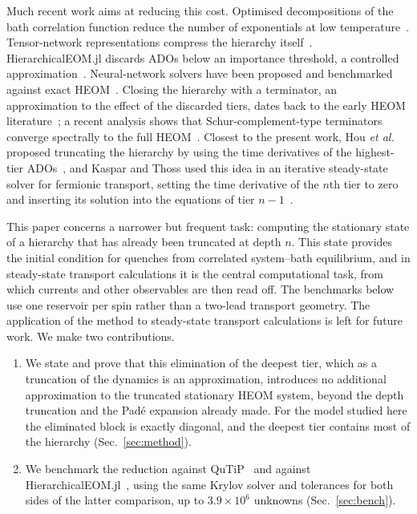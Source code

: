 \documentclass[11pt,a4paper]{article}
\begin{document}
Much recent work aims at reducing this cost. Optimised decompositions of the
bath correlation function reduce the number of exponentials at low
temperature~\cite{HuXuYan2010,Xu2022,Dan2023}. Tensor-network representations
compress the hierarchy itself~\cite{Shi2018,Borrelli2019,Ke2022}.
HierarchicalEOM.jl discards ADOs below an importance threshold, a controlled
approximation~\cite{Huang2023}. Neural-network solvers have been proposed and
benchmarked against exact HEOM~\cite{Cao2025,Cao2026}. Closing the hierarchy
with a terminator, an approximation to the effect of the discarded tiers, dates
back to the early HEOM literature~\cite{TanimuraWolynes1991,IshizakiTanimura2005};
a recent analysis shows that Schur-complement-type terminators converge
spectrally to the full HEOM~\cite{Vadimov2026}. Closest to the present work,
Hou \emph{et al.} proposed truncating the hierarchy by using the time
derivatives of the highest-tier ADOs~\cite{Hou2015}, and Kaspar and Thoss used
this idea in an iterative steady-state solver for fermionic transport, setting
the time derivative of the $n$th tier to zero and inserting its solution into
the equations of tier $n-1$~\cite{KasparThoss2021}.

This paper concerns a narrower but frequent task: computing the stationary
state of a hierarchy that has already been truncated at depth $n$. This state
provides the initial condition for quenches from correlated system--bath
equilibrium, and in steady-state transport calculations it is the central
computational task, from which currents and other observables are then read
off. The benchmarks below use one reservoir per spin rather than a two-lead
transport geometry. The application of the method to steady-state transport
calculations is left for future work. We make two contributions.
\begin{enumerate}
\item We state and prove that this elimination of the deepest tier, which
  as a truncation of the dynamics is an approximation, introduces no
  additional approximation to the truncated stationary HEOM system, beyond the
  depth truncation and the Padé expansion already made. For the model studied here the eliminated block is
  exactly diagonal, and the deepest tier contains most of the hierarchy
  (Sec.~\ref{sec:method}).
\item We benchmark the reduction against QuTiP~\cite{Lambert2023} and against
  HierarchicalEOM.jl~\cite{Huang2023}, using the same Krylov solver and
  tolerances for both sides of the latter comparison, up to
  $3.9\times10^{6}$ unknowns (Sec.~\ref{sec:bench}).
\end{enumerate}
\end{document}

